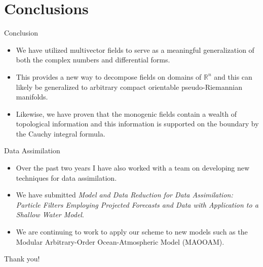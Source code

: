 \documentclass[aspectratio=169]{beamer}
\newcommand{\R}{\mathbb{R}}
\begin{document}
\section{Conclusions}

\begin{frame}{Conclusion}
\vfill
\begin{itemize}
\pause
    \item We have utilized multivector fields to serve as a meaningful generalization of both the complex numbers and differential forms. 
\pause
    \item This provides a new way to decompose fields on domains of $\R^n$ and this can likely be generalized to arbitrary compact orientable pseudo-Riemannian manifolds.
\pause
    \item Likewise, we have proven that the monogenic fields contain a wealth of topological information and this information is supported on the boundary by the Cauchy integral formula.
\end{itemize}
\vfill
\end{frame}

\begin{frame}{Data Assimilation}
\vfill
\begin{itemize}
\pause
\item Over the past two years I have also worked with a team on developing new techniques for data assimilation. 
\pause
\item We have submitted \emph{Model and Data Reduction for Data Assimilation: Particle Filters Employing Projected Forecasts and Data with Application to a Shallow Water Model}.
\pause
\item We are continuing to work to apply our scheme to new models such as the Modular Arbitrary-Order Ocean-Atmospheric Model (MAOOAM).
\end{itemize}
\vfill
\end{frame}

\begin{frame}{}
\vfill
\begin{center}
\large Thank you!
\end{center}
\vfill
\end{frame}
\end{document}
